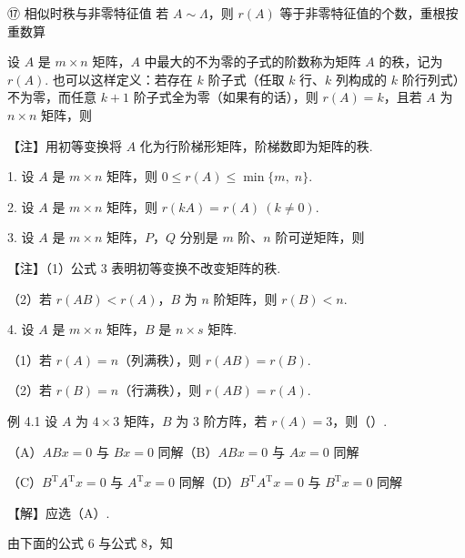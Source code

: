 \begin{fcard}{⑰ 相似时秩与非零特征值}
若 $A\sim\Lambda$，则 $r(A)$ 等于非零特征值的个数，重根按重数算
\end{fcard}



设 $A$ 是 $m\times n$ 矩阵，$A$ 中最大的不为零的子式的阶数称为矩阵 $A$ 的秩，记为 $r(A)$. 也可以这样定义：若存在 $k$ 阶子式（任取 $k$ 行、$k$ 列构成的 $k$ 阶行列式）不为零，而任意 $k+1$ 阶子式全为零（如果有的话），则 $r(A)=k$，且若 $A$ 为 $n\times n$ 矩阵，则

\begin{fnote}
【注】用初等变换将 $A$ 化为行阶梯形矩阵，阶梯数即为矩阵的秩.
\end{fnote}


1. 设 $A$ 是 $m\times n$ 矩阵，则 $0\le r(A)\le\min\{m,\;n\}$.

2. 设 $A$ 是 $m\times n$ 矩阵，则 $r(kA)=r(A)\ (k\ne 0)$.

3. 设 $A$ 是 $m\times n$ 矩阵，$P$，$Q$ 分别是 $m$ 阶、$n$ 阶可逆矩阵，则

\begin{fnote}
【注】（1）公式 3 表明初等变换不改变矩阵的秩.

（2）若 $r(AB)<r(A)$，$B$ 为 $n$ 阶矩阵，则 $r(B)<n$.
\end{fnote}

4. 设 $A$ 是 $m\times n$ 矩阵，$B$ 是 $n\times s$ 矩阵.

（1）若 $r(A)=n$（列满秩），则 $r(AB)=r(B)$.

（2）若 $r(B)=n$（行满秩），则 $r(AB)=r(A)$.

\begin{fcard}{例 4.1}
设 $A$ 为 $4\times 3$ 矩阵，$B$ 为 3 阶方阵，若 $r(A)=3$，则（\quad）.

（A）$ABx=0$ 与 $Bx=0$ 同解\qquad\qquad（B）$ABx=0$ 与 $Ax=0$ 同解

（C）$B^{\mathrm T}A^{\mathrm T}x=0$ 与 $A^{\mathrm T}x=0$ 同解\qquad（D）$B^{\mathrm T}A^{\mathrm T}x=0$ 与 $B^{\mathrm T}x=0$ 同解
\end{fcard}

【解】应选（A）.

由下面的公式 6 与公式 8，知

